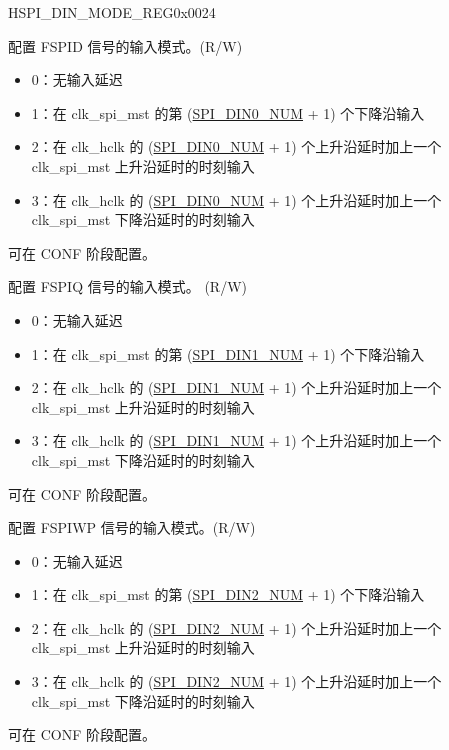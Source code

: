 \begin{register}{H}{SPI\_DIN\_MODE\_REG}{0x0024}\label{regdesc:SPIDINMODEREG}
%
%
%
%
%
%
%
\regnewline%
\begin{regdesc}\begin{reglist}
\label{fielddesc:SPIDIN0MODE}\item [SPI\_DIN0\_MODE] 配置 FSPID 信号的输入模式。(R/W)
\begin{itemize}
    \item 0：无输入延迟
    \item 1：在 clk\_spi\_mst 的第 (\hyperref[fielddesc:SPIDIN0NUM]{SPI\_DIN0\_NUM} + 1) 个下降沿输入
    \item 2：在 clk\_hclk 的 (\hyperref[fielddesc:SPIDIN0NUM]{SPI\_DIN0\_NUM} + 1) 个上升沿延时加上一个 clk\_spi\_mst 上升沿延时的时刻输入
    \item 3：在 clk\_hclk 的 (\hyperref[fielddesc:SPIDIN0NUM]{SPI\_DIN0\_NUM} + 1) 个上升沿延时加上一个 clk\_spi\_mst 下降沿延时的时刻输入
\end{itemize}
可在 CONF 阶段配置。 
\label{fielddesc:SPIDIN1MODE}\item [SPI\_DIN1\_MODE] 配置 FSPIQ 信号的输入模式。 (R/W)
\begin{itemize}
    \item 0：无输入延迟
    \item 1：在 clk\_spi\_mst 的第 (\hyperref[fielddesc:SPIDIN1NUM]{SPI\_DIN1\_NUM} + 1) 个下降沿输入
    \item 2：在 clk\_hclk 的 (\hyperref[fielddesc:SPIDIN1NUM]{SPI\_DIN1\_NUM} + 1) 个上升沿延时加上一个 clk\_spi\_mst 上升沿延时的时刻输入
    \item 3：在 clk\_hclk 的 (\hyperref[fielddesc:SPIDIN1NUM]{SPI\_DIN1\_NUM} + 1) 个上升沿延时加上一个 clk\_spi\_mst 下降沿延时的时刻输入
\end{itemize}
可在 CONF 阶段配置。
\label{fielddesc:SPIDIN2MODE}\item [SPI\_DIN2\_MODE] 配置 FSPIWP 信号的输入模式。(R/W)
\begin{itemize}
    \item 0：无输入延迟
    \item 1：在 clk\_spi\_mst 的第 (\hyperref[fielddesc:SPIDIN2NUM]{SPI\_DIN2\_NUM} + 1) 个下降沿输入
    \item 2：在 clk\_hclk 的 (\hyperref[fielddesc:SPIDIN2NUM]{SPI\_DIN2\_NUM} + 1) 个上升沿延时加上一个 clk\_spi\_mst 上升沿延时的时刻输入
    \item 3：在 clk\_hclk 的 (\hyperref[fielddesc:SPIDIN2NUM]{SPI\_DIN2\_NUM} + 1) 个上升沿延时加上一个 clk\_spi\_mst 下降沿延时的时刻输入
\end{itemize}
可在 CONF 阶段配置。

\item [见下页]
\end{reglist}\end{regdesc}
\end{register}

